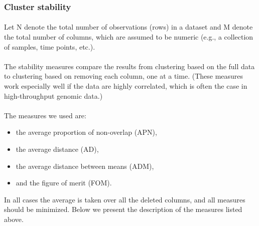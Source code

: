 \documentclass[10pt]{article}\usepackage[]{graphicx}\usepackage[]{color}
\begin{document}
\subsubsection{Cluster stability}
\paragraph{}
Let N denote the total number of observations (rows) in a dataset and M denote the total
number of columns, which are assumed to be numeric (e.g., a collection of samples, time
points, etc.). 
\paragraph{}
The stability measures compare the results from clustering based on the full
data to clustering based on removing each column, one at a time. (These measures 
work especially well if the data are highly correlated,
which is often the case in high-throughput genomic data.) 
\paragraph{}
The measures we used are:
\begin{itemize}
\item the average proportion of non-overlap (APN), 
\item the average distance (AD), 
\item the average distance between means (ADM),
\item and the figure of merit (FOM). 
\end{itemize}
In all cases the average is taken over all the deleted columns, and all measures should be minimized.
Below we present the description of the measures listed above.
\end{document}
